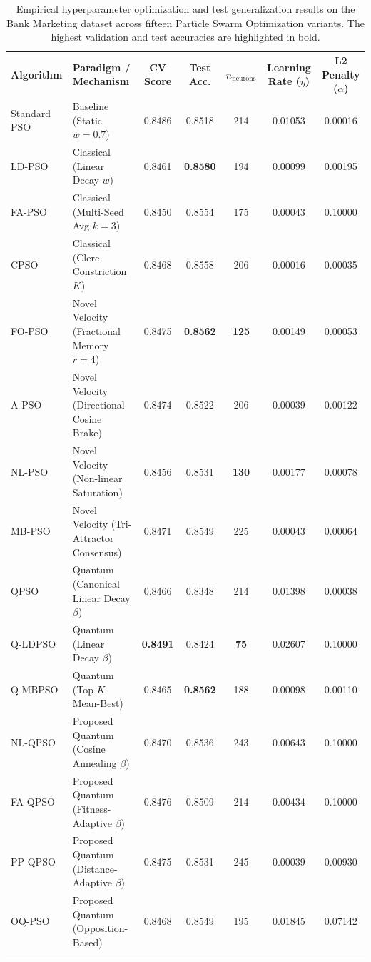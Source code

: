 \documentclass[10pt]{article}
\def\jfdsTopRule{\noalign{\hrule height 0.7pt\vskip 2pt}}
\def\jfdsMidRule{\noalign{\vskip 1.5pt\hrule height 0.4pt\vskip 2pt}}
\def\jfdsBotRule{\noalign{\vskip 1.5pt\hrule height 0.7pt}}
\begin{document}
\begin{table}[hb]
\centering
\fontsize{7.0pt}{9.6pt}\selectfont
\setlength{\tabcolsep}{4.5pt}
\caption{Empirical hyperparameter optimization and test generalization results on the Bank Marketing dataset across fifteen Particle Swarm Optimization variants. The highest validation and test accuracies are highlighted in bold.}
\label{tab:bank_marketing_results}
\vspace{3pt}
\begin{tabular}{llccccc}
\jfdsTopRule
\textbf{Algorithm} & \textbf{Paradigm / Mechanism} & \textbf{CV Score} & \textbf{Test Acc.} & \textbf{$n_{\mathrm{neurons}}$} & \textbf{Learning Rate ($\eta$)} & \textbf{L2 Penalty ($\alpha$)} \\
\jfdsMidRule
Standard PSO & Baseline (Static $w=0.7$) & 0.8486 & 0.8518 & 214 & 0.01053 & 0.00016 \\
LD-PSO & Classical (Linear Decay $w$) & 0.8461 & \textbf{0.8580} & 194 & 0.00099 & 0.00195 \\
FA-PSO & Classical (Multi-Seed Avg $k=3$) & 0.8450 & 0.8554 & 175 & 0.00043 & 0.10000 \\
CPSO & Classical (Clerc Constriction $K$) & 0.8468 & 0.8558 & 206 & 0.00016 & 0.00035 \\
\jfdsMidRule
FO-PSO & Novel Velocity (Fractional Memory $r=4$) & 0.8475 & \textbf{0.8562} & \textbf{125} & 0.00149 & 0.00053 \\
A-PSO & Novel Velocity (Directional Cosine Brake) & 0.8474 & 0.8522 & 206 & 0.00039 & 0.00122 \\
NL-PSO & Novel Velocity (Non-linear Saturation) & 0.8456 & 0.8531 & \textbf{130} & 0.00177 & 0.00078 \\
MB-PSO & Novel Velocity (Tri-Attractor Consensus) & 0.8471 & 0.8549 & 225 & 0.00043 & 0.00064 \\
\jfdsMidRule
QPSO & Quantum (Canonical Linear Decay $\beta$) & 0.8466 & 0.8348 & 214 & 0.01398 & 0.00038 \\
Q-LDPSO & Quantum (Linear Decay $\beta$) & \textbf{0.8491} & 0.8424 & \textbf{75} & 0.02607 & 0.10000 \\
Q-MBPSO & Quantum (Top-$K$ Mean-Best) & 0.8465 & \textbf{0.8562} & 188 & 0.00098 & 0.00110 \\
\jfdsMidRule
NL-QPSO & Proposed Quantum (Cosine Annealing $\beta$) & 0.8470 & 0.8536 & 243 & 0.00643 & 0.10000 \\
FA-QPSO & Proposed Quantum (Fitness-Adaptive $\beta$) & 0.8476 & 0.8509 & 214 & 0.00434 & 0.10000 \\
PP-QPSO & Proposed Quantum (Distance-Adaptive $\beta$) & 0.8475 & 0.8531 & 245 & 0.00039 & 0.00930 \\
OQ-PSO & Proposed Quantum (Opposition-Based) & 0.8468 & 0.8549 & 195 & 0.01845 & 0.07142 \\
\jfdsBotRule
\end{tabular}
\end{table}
\end{document}
